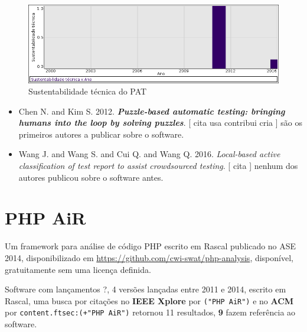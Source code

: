 \begin{figure}[h]
  \center
  \includegraphics[scale=0.50]{result-documents/charts/pat.png}
  \caption{Sustentabilidade técnica do PAT}
\end{figure}


\begin{itemize}
\item Chen N. and Kim S.
      2012.
        \textbf{\textit{ Puzzle-based automatic testing: bringing humans into the loop by solving puzzles}}.
      [
          cita
          usa
          contribui
          cria
      ]
são os primeiros autores a publicar sobre o software.
\item Wang J. and Wang S. and Cui Q. and Wang Q.
      2016.
        \textit{ Local-based active classification of test report to assist crowdsourced testing}.
      [
          cita
      ]
nenhum dos autores publicou sobre o software antes.
\end{itemize}
\section{PHP AiR}

Um framework para análise de código PHP escrito em Rascal
publicado no ASE 2014,
disponibilizado em \url{https://github.com/cwi-swat/php-analysis},
disponível,
gratuitamente
sem uma licença definida.

Software com lançamentos ?,
4 versões lançadas
entre 2011 e 2014,
escrito em Rascal,
uma busca por citações no {\bf IEEE Xplore} por
\texttt{("PHP AiR")}
e no {\bf ACM} por
\texttt{content.ftsec:(+"PHP AiR")}
retornou
11 resultados,
{\bf 9} fazem referência ao software.


